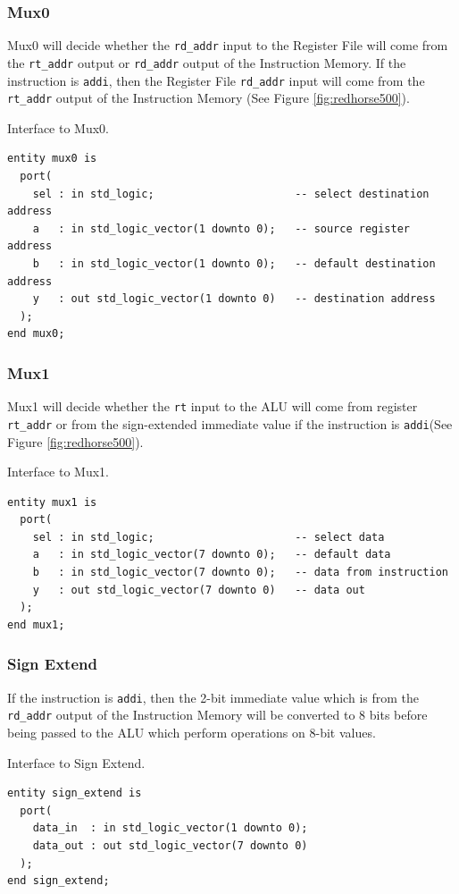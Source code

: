 \documentclass[a4paper, 11pt,oneside]{article}
\begin{document}
\subsubsection{Mux0}
Mux0 will decide whether the \texttt{rd_addr} input to the Register 
File will come from the \texttt{rt_addr} output or 
\texttt{rd_addr} output of the Instruction Memory. If the 
instruction is \texttt{addi}, then the Register File 
\texttt{rd_addr} input will come from the \texttt{rt_addr} 
output of the Instruction Memory (See Figure \ref{fig:redhorse500}).

\begin{listing}[H]
\caption{Interface to Mux0.}
\label{code:mux0}
\begin{verbatim}
entity mux0 is
  port(
    sel : in std_logic;                      -- select destination address
    a   : in std_logic_vector(1 downto 0);   -- source register address
    b   : in std_logic_vector(1 downto 0);   -- default destination address
    y   : out std_logic_vector(1 downto 0)   -- destination address
  );
end mux0;
\end{verbatim}
\end{listing}

\subsubsection{Mux1}
Mux1 will decide whether the \texttt{rt} input to the ALU will come 
from register \texttt{rt_addr} or from the sign-extended immediate 
value if the instruction is \texttt{addi}(See Figure 
\ref{fig:redhorse500}).

\begin{listing}[H]
\caption{Interface to Mux1.}
\label{code:mux1}
\begin{verbatim}
entity mux1 is
  port(
    sel : in std_logic;                      -- select data
    a   : in std_logic_vector(7 downto 0);   -- default data
    b   : in std_logic_vector(7 downto 0);   -- data from instruction
    y   : out std_logic_vector(7 downto 0)   -- data out
  );
end mux1;
\end{verbatim}
\end{listing}


\subsubsection{Sign Extend}
If the instruction is \texttt{addi}, then the 2-bit immediate value 
which is from the 
\texttt{rd_addr} output of the Instruction Memory will be converted 
to 8 bits before being passed to the ALU which perform operations on 8-bit 
values.
\begin{listing}[H]
\caption{Interface to Sign Extend.}
\label{code:sign_extend}
\begin{verbatim}
entity sign_extend is
  port(
    data_in  : in std_logic_vector(1 downto 0);
    data_out : out std_logic_vector(7 downto 0)
  );
end sign_extend;
\end{verbatim}
\end{listing}
\end{document}
